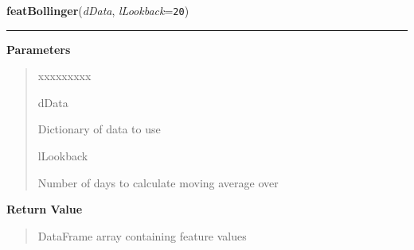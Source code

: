 \hspace{.8\funcindent}\begin{boxedminipage}{\funcwidth}

    \raggedright \textbf{featBollinger}(\textit{dData}, \textit{lLookback}={\tt 20})

    \vspace{-1.5ex}

    \rule{\textwidth}{0.5\fboxrule}
\setlength{\parskip}{2ex}
\setlength{\parskip}{1ex}
      \textbf{Parameters}
      \vspace{-1ex}

      \begin{quote}
        \begin{Ventry}{xxxxxxxxx}

          \item[dData]

          Dictionary of data to use

          \item[lLookback]

          Number of days to calculate moving average over

        \end{Ventry}

      \end{quote}

      \textbf{Return Value}
    \vspace{-1ex}

      \begin{quote}
      DataFrame array containing feature values

      \end{quote}

    \end{boxedminipage}

    \label{QSTK:qstkfeat:features:featCorrelation}

    \vspace{0.5ex}

